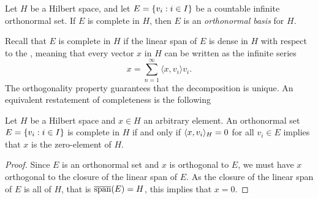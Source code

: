 \documentclass[../thesis.tex]{subfiles}
\begin{document}
\begin{definition}
    Let $H$ be a Hilbert space, and let $E = \{v_i : i \in I\}$ be a countable infinite orthonormal set. If $E$ is complete in $H$, then $E$ is an \emph{orthonormal basis} for $H$.
\end{definition}
Recall that $E$ is complete in $H$ if the linear span of $E$ is dense in $H$ with respect to the \GenNormH, meaning that every vector $x$ in $H$ can be written as the infinite series
\begin{equation*}%
    x= \sum_{n=1}^{\infty} \langle x, v_i \rangle v_i . %
\end{equation*}
The orthogonality property guarantees that the decomposition is unique. %
An equivalent restatement of completeness is the following
\begin{lemma}\label{lem:ONB_alternative_def}
    Let $H$ be a Hilbert space and $x\in H$ an arbitrary element. An orthonormal set $E = \{v_i: i \in I\}$ is complete in $H$ if and only if $\langle x, v_i\rangle_{H} = 0$ for all $v_i\in E$ implies that $x$ is the zero-element of $H$.
\end{lemma}
\begin{proof}
    Since $E$ is an orthonormal set and $x$ is orthogonal to $E$, we must have $x$ orthogonal to the closure of the linear span of $E$. As the closure of the linear span of $E$ is all of $H$, that is $\overline{\operatorname{span}}(E) = H$, this implies that $x=0$. %
\end{proof}
\end{document}
